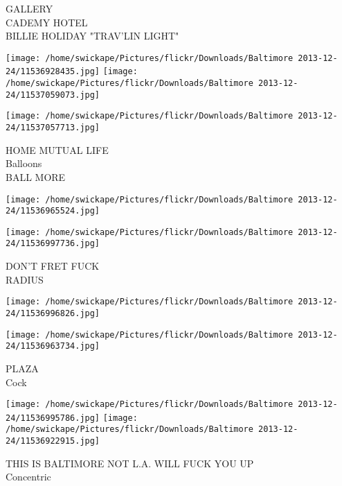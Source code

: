 \documentclass[10pt,letterpaper]{article}
\begin{document}
GALLERY\\
CADEMY HOTEL\\
BILLIE HOLIDAY "TRAV'LIN LIGHT"\\
\pagebreak

\texttt{[image: /home/swickape/Pictures/flickr/Downloads/Baltimore 2013-12-24/11536928435.jpg]}
\texttt{[image: /home/swickape/Pictures/flickr/Downloads/Baltimore 2013-12-24/11537059073.jpg]}

\texttt{[image: /home/swickape/Pictures/flickr/Downloads/Baltimore 2013-12-24/11537057713.jpg]}

HOME MUTUAL LIFE\\
Balloons\\
BALL MORE\\
\pagebreak

\texttt{[image: /home/swickape/Pictures/flickr/Downloads/Baltimore 2013-12-24/11536965524.jpg]}

\vspace{0.25in}
\texttt{[image: /home/swickape/Pictures/flickr/Downloads/Baltimore 2013-12-24/11536997736.jpg]}

DON'T FRET FUCK\\
RADIUS\\
\pagebreak

\texttt{[image: /home/swickape/Pictures/flickr/Downloads/Baltimore 2013-12-24/11536996826.jpg]}

\vspace{0.25in}
\texttt{[image: /home/swickape/Pictures/flickr/Downloads/Baltimore 2013-12-24/11536963734.jpg]}

PLAZA\\
Cock\\
\pagebreak

\texttt{[image: /home/swickape/Pictures/flickr/Downloads/Baltimore 2013-12-24/11536995786.jpg]}
\texttt{[image: /home/swickape/Pictures/flickr/Downloads/Baltimore 2013-12-24/11536922915.jpg]}

THIS IS BALTIMORE NOT L.A. WILL FUCK YOU UP\\
Concentric\\
\pagebreak
\end{document}
